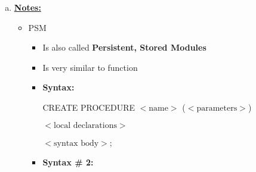 \documentclass[12pt]{article}
\begin{document}
\begin{enumerate}[1.]
\begin{enumerate}[a)]
\begin{lstlisting}[language=c]
                printf("Enter correct launched date (YYYY-MM-DD, Press enter to skip):\n");
                fgets(dateLaunched, sizeof(dateLaunched), stdin);

                if (dateLaunched[0] != '\n') {
                    // Correct date of launch
                    EXEC SQL UPDATE Ships
                             SET launched = newDateLaunched
                             WHERE name=:shipName AND
                                   class=:class AND
                                   launched=:dateLaunched;
                }

                printf("Enter correct battle date (YYYY-MM-DD, Press enter to skip):\n");
                fgets(dateBattle, sizeof(dateBattle),stdin);

                if (dateBattle[0] != '\n') {
                    // Correct date of battle
                    EXEC SQL UPDATE Battles
                             SET date = newDateBattle
                             WHERE name=:battle AND
                                   date=dateBattle;
                }
            }
        EXEC SQL CLOSE execCursor;

    }
    \end{lstlisting}

        \item

        \bigskip

        \underline{\textbf{Notes:}}

        \bigskip

        \begin{itemize}
            \item PSM
            \begin{itemize}
                \item Is also called \textbf{Persistent, Stored Modules}
                \item Is very similar to function
                \item \textbf{Syntax:}

                \bigskip

                CREATE PROCEDURE $<\text{name}>$ ($<\text{parameters}>$)

                    $<\text{local declarations}>$

                    $<\text{syntax body}>$;

                \item \textbf{Syntax \# 2:}


\end{itemize}
\end{itemize}
\end{enumerate}
\end{enumerate}
\end{document}
